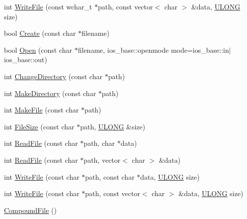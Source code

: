 \begin{DoxyCompactItemize}
int \hyperlink{class_y_compound_files_1_1_compound_file_a73c89efa6826bf8051ed419fdaa3d289}{Write\+File} (const wchar\+\_\+t $\ast$path, const vector$<$ char $>$ \&data, \hyperlink{_basic_excel_8hpp_abe09d1bea023be6a07cbadde8e955435}{U\+L\+O\+N\+G} size)
\item 
bool \hyperlink{class_y_compound_files_1_1_compound_file_a12b9bb7ce39771cc233d4ff944df6181}{Create} (const char $\ast$filename)
\item 
bool \hyperlink{class_y_compound_files_1_1_compound_file_a66d3d1b8523a1ec9c43f0a8cd11190df}{Open} (const char $\ast$filename, ios\+\_\+base\+::openmode mode=ios\+\_\+base\+::in$\vert$ios\+\_\+base\+::out)
\item 
int \hyperlink{class_y_compound_files_1_1_compound_file_a5e1745f4a98a4da82d3c609392223fba}{Change\+Directory} (const char $\ast$path)
\item 
int \hyperlink{class_y_compound_files_1_1_compound_file_a973a7841893de0bfaad02be7d170be27}{Make\+Directory} (const char $\ast$path)
\item 
int \hyperlink{class_y_compound_files_1_1_compound_file_a772c378867d2734a55bfab5eca682c1c}{Make\+File} (const char $\ast$path)
\item 
int \hyperlink{class_y_compound_files_1_1_compound_file_ad9bc3b694a36fef87c76b1d6bdf89515}{File\+Size} (const char $\ast$path, \hyperlink{_basic_excel_8hpp_abe09d1bea023be6a07cbadde8e955435}{U\+L\+O\+N\+G} \&size)
\item 
int \hyperlink{class_y_compound_files_1_1_compound_file_ae19b936f56f36e02e958151befb3247c}{Read\+File} (const char $\ast$path, char $\ast$data)
\item 
int \hyperlink{class_y_compound_files_1_1_compound_file_a221d8fab5d542c5b71fd86707389724b}{Read\+File} (const char $\ast$path, vector$<$ char $>$ \&data)
\item 
int \hyperlink{class_y_compound_files_1_1_compound_file_ae61210da7aa1ebff0acfbc66bc29dfd1}{Write\+File} (const char $\ast$path, const char $\ast$data, \hyperlink{_basic_excel_8hpp_abe09d1bea023be6a07cbadde8e955435}{U\+L\+O\+N\+G} size)
\item 
int \hyperlink{class_y_compound_files_1_1_compound_file_adbf9ade5e8ccc8b0873e7a470d32918d}{Write\+File} (const char $\ast$path, const vector$<$ char $>$ \&data, \hyperlink{_basic_excel_8hpp_abe09d1bea023be6a07cbadde8e955435}{U\+L\+O\+N\+G} size)
\item 
\hyperlink{class_y_compound_files_1_1_compound_file_af4b6835e9949d08d62dab4414fb80c72}{Compound\+File} ()
\item 

\end{DoxyCompactItemize}
